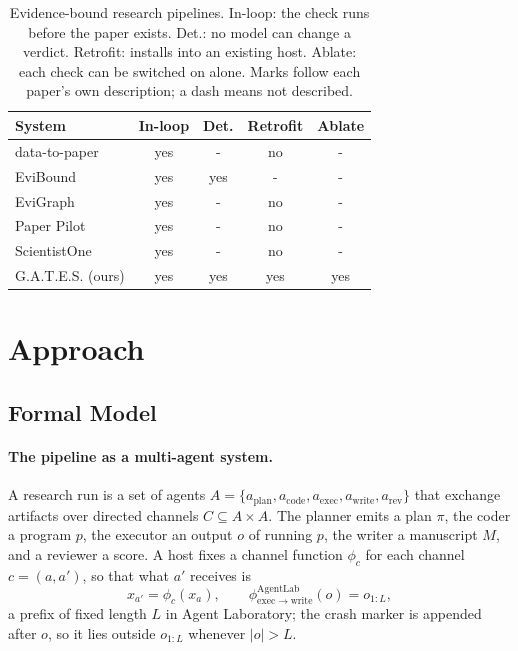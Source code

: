 \documentclass[sigconf,anonymous]{aamas}
\newcommand{\gates}{G.A.T.E.S.}
\newcommand{\Man}{M}
\begin{document}
\begin{table}[t]
\caption{Evidence-bound research pipelines. In-loop: the check runs before the paper exists. Det.: no model can change a verdict. Retrofit: installs into an existing host. Ablate: each check can be switched on alone. Marks follow each paper's own description; a dash means not described.}
\label{tab:prior}
\small
\begin{tabular}{lcccc}
\toprule
System & In-loop & Det. & Retrofit & Ablate \\
\midrule
data-to-paper~\cite{ifargan2024datatopaper} & yes & - & no & - \\
EviBound~\cite{chen2025evibound} & yes & yes & - & - \\
EviGraph~\cite{ren2026evigraph} & yes & - & no & - \\
Paper Pilot~\cite{jha2026paperpilot} & yes & - & no & - \\
ScientistOne~\cite{meng2026scientistone} & yes & - & no & - \\
\gates{} (ours) & yes & yes & yes & yes \\
\bottomrule
\end{tabular}
\end{table}

\section{Approach}
\label{sec:approach}

\subsection{Formal Model}
\label{sec:model}

\paragraph{The pipeline as a multi-agent system.}
A research run is a set of agents $A = \{a_{\mathrm{plan}}, a_{\mathrm{code}}, a_{\mathrm{exec}}, a_{\mathrm{write}}, a_{\mathrm{rev}}\}$ that exchange artifacts over directed channels $C \subseteq A \times A$.
The planner emits a plan $\pi$, the coder a program $p$, the executor an output $o$ of running $p$, the writer a manuscript $\Man$, and a reviewer a score.
A host fixes a channel function $\phi_c$ for each channel $c = (a, a')$, so that what $a'$ receives is
\begin{equation}
\label{eq:channel}
x_{a'} = \phi_{c}(x_a), \qquad \phi^{\mathrm{AgentLab}}_{\mathrm{exec}\to\mathrm{write}}(o) = o_{1:L},
\end{equation}
a prefix of fixed length $L$ in Agent Laboratory; the crash marker is appended after $o$, so it lies outside $o_{1:L}$ whenever $|o| > L$.
\end{document}
